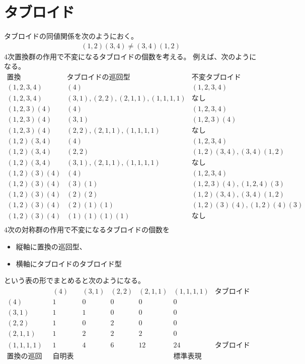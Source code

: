 \section{タブロイド}\label{s1:タブロイド} %
	タブロイドの同値関係を次のようにおく。
	\begin{equation*}\begin{split} %
		(1,2)(3,4) \neq (3,4)(1,2)
	\end{split}\end{equation*} %
	$4$次置換群の作用で不変になるタブロイドの個数を考える。
	例えば、次のようになる。
	\begin{equation*}\begin{array}{rrr} %
		\text{置換} & \text{タブロイドの巡回型} & \text{不変タブロイド} \\
		(1,2,3,4) & (4) & (1,2,3,4) \\
		(1,2,3,4) & (3,1),(2,2),(2,1,1),(1,1,1,1) & \text{なし} \\
		(1,2,3)(4) & (4) & (1,2,3,4) \\
		(1,2,3)(4) & (3,1) & (1,2,3)(4) \\
		(1,2,3)(4) & (2,2),(2,1,1),(1,1,1,1) & \text{なし} \\
		(1,2)(3,4) & (4) & (1,2,3,4) \\
		(1,2)(3,4) & (2,2) & (1,2)(3,4),(3,4)(1,2) \\
		(1,2)(3,4) & (3,1),(2,1,1),(1,1,1,1) & \text{なし} \\
		(1,2)(3)(4) & (4) & (1,2,3,4) \\
		(1,2)(3)(4) & (3)(1) & (1,2,3)(4),(1,2,4)(3) \\
		(1,2)(3)(4) & (2)(2) & (1,2)(3,4),(3,4)(1,2) \\
		(1,2)(3)(4) & (2)(1)(1) & (1,2)(3)(4),(1,2)(4)(3) \\
		(1,2)(3)(4) & (1)(1)(1)(1) & \text{なし} \\
	\end{array}\end{equation*} %
	$4$次の対称群の作用で不変になるタブロイドの個数を
	\begin{itemize}\setlength{\itemsep}{-1mm} %
		\item 縦軸に置換の巡回型、
		\item 横軸にタブロイドのタブロイド型
	\end{itemize} %
	という表の形でまとめると次のようになる。
	\begin{equation*}\begin{array}{r|rrrrr|c}
		& (4) & (3,1) & (2,2) & (2,1,1) & (1,1,1,1) & \text{タブロイド型} \\ \hline
		(4) & 1 & 0 & 0 & 0 & 0 \\
		(3,1) & 1 & 1 & 0 & 0 & 0 \\
		(2,2) & 1 & 0 & 2 & 0 & 0 \\
		(2,1,1) & 1 & 2 & 2 & 2 & 0 \\
		(1,1,1,1) & 1 & 4 & 6 & 12 & 24 & \text{タブロイドの個数} \\ \hline
		\text{置換の巡回型} & \text{自明表現} &&&& \text{標準表現} \\
	\end{array}\end{equation*} %
